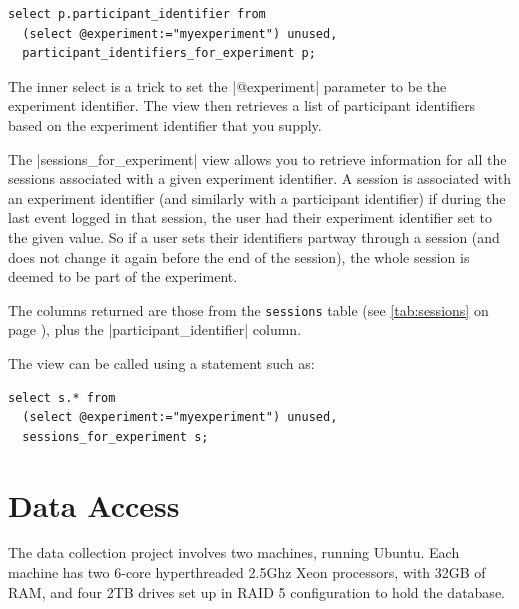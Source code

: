 \documentclass{report}
\newcommand{\myref}[1]{\autoref{#1} on page \pageref*{#1}}
\newcommand{\tabref}[1]{\lstinline|#1| table (see \myref{tab:#1})}
\begin{document}
\begin{lstlisting}
select p.participant_identifier from
  (select @experiment:="myexperiment") unused,
  participant_identifiers_for_experiment p;
\end{lstlisting}

The inner select is a trick to set the |@experiment| parameter to be the
experiment identifier.  The view then retrieves a list of participant
identifiers based on the experiment identifier that you supply.



The |sessions_for_experiment| view allows you to retrieve information for all
the sessions associated with a given experiment identifier.  A session is
associated with an experiment identifier (and similarly with a participant
identifier) if during the last event logged in that session, the user had
their experiment identifier set to the given value.  So if a user sets their
identifiers partway through a session (and does not change it again before the
end of the session), the whole session is deemed to be part of the experiment.

The columns returned are those from the \tabref{sessions}, plus the
|participant_identifier| column.

The view can be called using a statement such as:

\begin{lstlisting}
select s.* from
  (select @experiment:="myexperiment") unused,
  sessions_for_experiment s;
\end{lstlisting}




\chapter{Data Access}

The data collection project involves two machines, running Ubuntu.  Each
machine has two 6-core hyperthreaded 2.5Ghz Xeon processors, with 32GB of RAM,
and four 2TB drives set up in RAID 5 configuration to hold the database.
\end{document}
